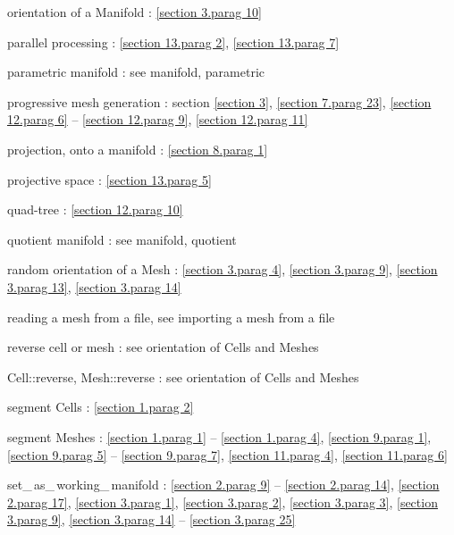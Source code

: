 \documentclass[a4paper]{scrreprt}
\def\numb{}
\newcommand\verm[1]{\textcolor{manif}{#1}}
\renewcommand\tt{\normalfont\ttfamily}
\begin{document}
\noindent
orientation of a {\small\tt \verm{Manifold}} : \ref{\numb section 3.\numb parag 10}

\noindent
parallel processing : \ref{\numb section 13.\numb parag 2}, \ref{\numb section 13.\numb parag 7}

\noindent
parametric manifold : see manifold, parametric

\noindent
progressive mesh generation : section \ref{\numb section 3}, \ref{\numb section 7.\numb parag 23},
\ref{\numb section 12.\numb parag 6} -- \ref{\numb section 12.\numb parag 9},
\ref{\numb section 12.\numb parag 11}

\noindent
projection, onto a manifold :
\ref{\numb section 8.\numb parag 1}

\noindent
projective space : \ref{\numb section 13.\numb parag 5}

\noindent
quad-tree : \ref{\numb section 12.\numb parag 10}

\noindent
quotient manifold : see manifold, quotient

\noindent
random orientation of a {\small\tt\verm{Mesh}} : \ref{\numb section 3.\numb parag 4},
\ref{\numb section 3.\numb parag 9}, \ref{\numb section 3.\numb parag 13},
\ref{\numb section 3.\numb parag 14}

\noindent
reading a mesh from a file, see importing a mesh from a file

\noindent
reverse cell or mesh : see orientation of {\small\tt \verm{Cell}}s and {\small\tt \verm{Mesh}}es

\noindent
{\small\tt\verm{Cell}::reverse}, {\small\tt\verm{Mesh}::reverse} :
see orientation of {\small\tt \verm{Cell}}s and {\small\tt \verm{Mesh}}es

\noindent
segment {\small\tt \verm{Cell}}s : \ref{\numb section 1.\numb parag 2}

\noindent
segment {\small\tt \verm{Mesh}}es :
\ref{\numb section 1.\numb parag 1} -- \ref{\numb section 1.\numb parag 4},
\ref{\numb section 9.\numb parag 1}, \ref{\numb section 9.\numb parag 5} --
\ref{\numb section 9.\numb parag 7}, \ref{\numb section 11.\numb parag 4},
\ref{\numb section 11.\numb parag 6}

\noindent
{\small\tt set\_\,as\_\,working\_\,manifold} :
\ref{\numb section 2.\numb parag 9} -- \ref{\numb section 2.\numb parag 14},
\ref{\numb section 2.\numb parag 17}, \ref{\numb section 3.\numb parag 1},
\ref{\numb section 3.\numb parag 2}, \ref{\numb section 3.\numb parag 3},
\ref{\numb section 3.\numb parag 9},
\ref{\numb section 3.\numb parag 14} -- \ref{\numb section 3.\numb parag 25}
\end{document}
